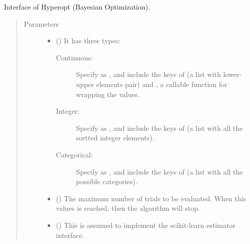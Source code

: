 \documentclass[letterpaper,10pt,english]{sphinxmanual}
\begin{document}
\begin{fulllineitems}
\label{\detokenize{apidoc:pybayopt.bayopt_tpe.TPEOPT}}
Interface of Hyperopt (Bayesian Optimization).
\begin{quote}\begin{description}
\item[{Parameters}] \leavevmode\begin{itemize}
\item {} 
 () \textendash{} 
It has three types:
\begin{description}
\item[{Continuous: }] \leavevmode
Specify  as , and include the keys of  (a list with lower-upper elements pair) and
, a callable function for wrapping the values.

\item[{Integer:}] \leavevmode
Specify  as , and include the keys of  (a list with all the sortted integer elements).

\item[{Categorical:}] \leavevmode
Specify  as , and include the keys of  (a list with all the possible categories).

\end{description}


\item {} 
 (\sphinxstyleliteralemphasis{\sphinxupquote{, }}\sphinxstyleliteralemphasis{\sphinxupquote{, }}) \textendash{} The maximum number of trials to be evaluated. When this values is reached, 
then the algorithm will stop.

\item {} 
 () \textendash{} This is assumed to implement the scikit-learn estimator interface.


\end{itemize}
\end{description}
\end{quote}
\end{fulllineitems}
\end{document}
